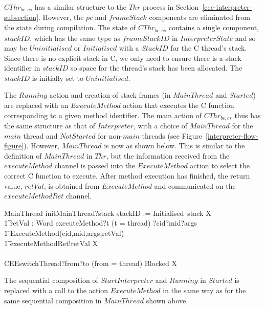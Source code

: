 $CThr_{bc,cs}$ has a similar structure to the $Thr$ process in
Section~\ref{cee-interpreter-subsection}.
However, the $pc$ and $frameStack$ components are eliminated from the
state during compilation.
The state of $CThr_{bc,cs}$ contains a single component, $stackID$,
which has the same type as $frameStackID$ in $InterpreterState$ and so
may be $Uninitialised$ or $Initialised$ with a $StackID$ for the C
thread's stack.
Since there is no explicit stack in C, we only need to ensure there is
a stack identifier in $stackID$ so space for the thread's stack has
been allocated.
The $stackID$ is initially set to $Uninitialised$.

The $Running$ action and creation of stack frames (in $MainThread$ and
$Started$) are replaced with an $ExecuteMethod$ action that
executes the C function corresponding to a given method identifier.
The main action of $CThr_{bc,cs}$ thus has the same structure as that
of $Interpreter$, with a choice of $MainThread$ for the $main$ thread
and $NotStarted$ for non-$main$ threads (see
Figure~\ref{interpreter-flow-figure}).
However, $MainThread$ is now as shown below.
This is similar to the definition of $MainThread$ in $Thr$, but the
information received from the $executeMethod$ channel is passed into
the $ExecuteMethod$ action to select the correct C function to
execute.
After method execution has finished, the return value, $retVal$, is
obtained from $ExecuteMethod$ and communicated on the
$executeMethodRet$ channel.
\begin{circusaction}
  MainThread \circdef initMainThread?stack \then stackID := Initialised~stack \circseq \circmu X \circspot \\
  \t1 \circblockbegin
  \circvar retVal : Word \circspot executeMethod?t \prefixcolon (t = thread) ?cid?mid?args \then {} \\
  \t1 ExecuteMethod(cid,mid,args,retVal) \circseq \\
  \t1 executeMethodRet!retVal \then X \\
  {} \extchoice {} \\
  CEEswitchThread?from?to \prefixcolon (from = thread) \then Blocked
  \circseq X \circblockend
\end{circusaction}
The sequential composition of $StartInterpreter$ and $Running$ in
$Started$ is replaced with a call to the action $ExecuteMethod$ in the
same way as for the same sequential composition in $MainThread$ shown
above.

